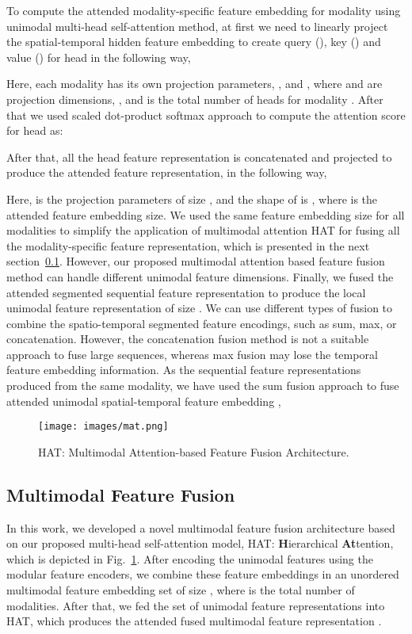 \documentclass[runningheads]{llncs}
\newcommand{\hattn}{HAT}
\newcommand{\fhattn}{HAT: \textbf{H}ierarchical \textbf{At}tention}
\begin{document}
To compute the attended modality-specific feature embedding  for modality  using unimodal multi-head self-attention method, at first we need to linearly project the spatial-temporal hidden feature embedding  to create query (), key () and value () for head  in the following way,

Here, each modality  has its own projection parameters, , and , where  and  are projection dimensions, , and  is the total number of heads for modality . After that we used scaled dot-product softmax approach to compute the attention score for head  as:

After that, all the head feature representation is concatenated and projected to produce the attended feature representation,  in the following way, 

Here,  is the projection parameters of size , and the shape of  is , where  is the attended feature embedding size. We used the same feature embedding size  for all modalities to simplify the application of multimodal attention {\hattn } for fusing all the modality-specific feature representation, which is presented in the next section~\ref{sec:mat}. However, our proposed multimodal attention based feature fusion method can handle different unimodal feature dimensions. Finally, we fused the attended segmented sequential feature representation  to produce the local unimodal feature representation  of size . We can use different types of fusion to combine the spatio-temporal segmented feature encodings, such as sum, max, or concatenation. However, the concatenation fusion method is not a suitable approach to fuse large sequences, whereas max fusion may lose the temporal feature embedding information. As the sequential feature representations produced from the same modality, we have used the sum fusion approach to fuse attended unimodal spatial-temporal feature embedding ,


\begin{figure}[!t]
    \centering
    \texttt{[image: images/mat.png]}
    \caption{{\hattn :} Multimodal Attention-based Feature Fusion Architecture.}
    \label{fig:mma}
     \vspace{-0.2in}
\end{figure}

\subsection{Multimodal Feature Fusion}
\label{sec:mat}

In this work, we developed a novel multimodal feature fusion architecture based on our proposed multi-head self-attention model, \fhattn, which is depicted in Fig.~\ref{fig:mma}. After encoding the unimodal features using the modular feature encoders, we combine these feature embeddings  in an unordered multimodal feature embedding set  of size , where  is the total number of modalities. After that, we fed the set of unimodal feature representations  into \hattn, which produces the attended fused multimodal feature representation . 
\end{document}
